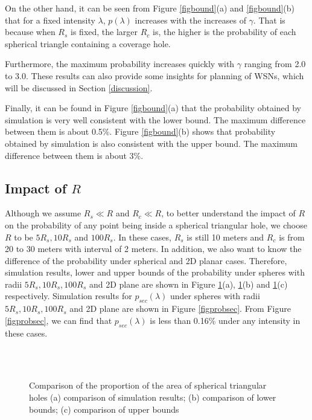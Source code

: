 \documentclass[journal, twoside]{IEEEtran}
\begin{document}
On the other hand, it can be seen from Figure \ref{figbound}(a) and \ref{figbound}(b) that 
for a fixed intensity $\lambda$, $p(\lambda)$ increases with the increases of $\gamma$. 
That is because when $R_s$ is fixed, the larger $R_c$ is, the higher is the probability
of each spherical triangle containing a coverage hole. 

Furthermore, the maximum probability increases quickly with $\gamma$ ranging from 2.0 
to 3.0. These results can also provide some insights for planning of WSNs, which will
be discussed in Section \ref{discussion}.

Finally, it can be found in Figure \ref{figbound}(a) that the probability obtained by 
simulation is very well consistent with the lower bound. The maximum difference 
between them is about 0.5\%. Figure \ref{figbound}(b) shows that probability obtained 
by simulation is also consistent with the upper bound. The maximum difference 
between them is about 3\%.

\subsection{Impact of $R$}

Although we assume $R_s \ll R$ and $R_c \ll R$, to better understand the impact
of $R$ on the probability of any point being inside a spherical triangular hole,
we choose $R$ to be $5 R_s, 10 R_s$ and $100 R_s$. In these cases, $R_s$ is still 10 meters and $R_c$ is from 20 to 30 meters with interval of 2 meters. In addition, we also want to
know the difference of the probability under spherical and 2D planar cases.
Therefore, simulation results, lower and upper bounds of the probability
under spheres with radii $5 R_s, 10 R_s, 100 R_s$ and 2D plane are shown
in Figure \ref{figcomp}(a), \ref{figcomp}(b) and \ref{figcomp}(c) respectively.
Simulation results for $p_{sec}(\lambda)$ under spheres with radii 
$5 R_s, 10 R_s, 100 R_s$ and 2D plane are shown in Figure \ref{figprobsec}.
From Figure \ref{figprobsec}, we can find that $p_{sec}(\lambda)$ is less
than 0.16\% under any intensity in these cases.

\begin{figure}[!t]
  \centering {}
  \\
  \\
  \caption{Comparison of the proportion of the area of spherical triangular holes (a) comparison of simulation results;
    (b) comparison of lower bounds; (c) comparison of upper bounds}
  \label{figcomp}
\end{figure}
\end{document}
